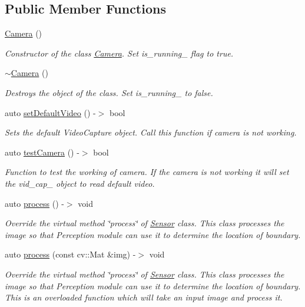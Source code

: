 \subsection*{Public Member Functions}
\begin{DoxyCompactItemize}
\item 
\hyperlink{class_camera_a01f94c3543f56ede7af49dc778f19331}{Camera} ()
\begin{DoxyCompactList}\small\item\em Constructor of the class \hyperlink{class_camera}{Camera}. Set is\+\_\+running\+\_\+ flag to true. \end{DoxyCompactList}\item 
\hyperlink{class_camera_ad1897942d0ccf91052386388a497349f}{$\sim$\+Camera} ()
\begin{DoxyCompactList}\small\item\em Destroys the object of the class. Set is\+\_\+running\+\_\+ to false. \end{DoxyCompactList}\item 
auto \hyperlink{class_camera_ad9cc807466f09917e7f62d0d6c2e5b46}{set\+Default\+Video} () -\/$>$ bool
\begin{DoxyCompactList}\small\item\em Sets the default Video\+Capture object. Call this function if camera is not working. \end{DoxyCompactList}\item 
auto \hyperlink{class_camera_a467955a89a912bfcae67ee0905a8cd86}{test\+Camera} () -\/$>$ bool
\begin{DoxyCompactList}\small\item\em Function to test the working of camera. If the camera is not working it will set the vid\+\_\+cap\+\_\+ object to read default video. \end{DoxyCompactList}\item 
auto \hyperlink{class_camera_a3af312509cb2a7167ad0dc6280cd9207}{process} () -\/$>$ void
\begin{DoxyCompactList}\small\item\em Override the virtual method \char`\"{}process\char`\"{} of \hyperlink{class_sensor}{Sensor} class. This class processes the image so that Perception module can use it to determine the location of boundary. \end{DoxyCompactList}\item 
auto \hyperlink{class_camera_a96de7932cff3f51163250efa2762bb10}{process} (const cv\+::\+Mat \&img) -\/$>$ void
\begin{DoxyCompactList}\small\item\em Override the virtual method \char`\"{}process\char`\"{} of \hyperlink{class_sensor}{Sensor} class. This class processes the image so that Perception module can use it to determine the location of boundary. This is an overloaded function which will take an input image and process it. \end{DoxyCompactList}\item 

\end{DoxyCompactItemize}
